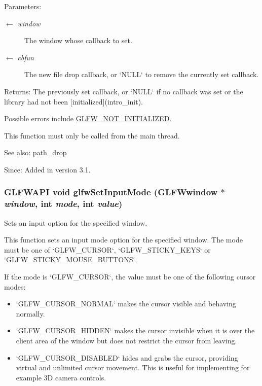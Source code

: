 \begin{Desc}
\item[Parameters:]
\begin{description}
\item[\mbox{$\leftarrow$} {\em window}]The window whose callback to set. \item[\mbox{$\leftarrow$} {\em cbfun}]The new file drop callback, or `NULL` to remove the currently set callback. \end{description}
\end{Desc}
\begin{Desc}
\item[Returns:]The previously set callback, or `NULL` if no callback was set or the library had not been \mbox{[}initialized\mbox{]}(intro\_\-init).\end{Desc}
Possible errors include \hyperlink{group__errors_g2374ee02c177f12e1fa76ff3ed15e14a}{GLFW\_\-NOT\_\-INITIALIZED}.

This function must only be called from the main thread.

\begin{Desc}
\item[See also:]path\_\-drop\end{Desc}
\begin{Desc}
\item[Since:]Added in version 3.1. \end{Desc}
\hypertarget{group__input_ge1eb729d2dd91dc33fd60e150a6e1684}{
\subsubsection[glfwSetInputMode]{\setlength{\rightskip}{0pt plus 5cm}GLFWAPI void glfwSetInputMode ({\bf GLFWwindow} $\ast$ {\em window}, \/  int {\em mode}, \/  int {\em value})}}
\label{group__input_ge1eb729d2dd91dc33fd60e150a6e1684}


Sets an input option for the specified window. 

This function sets an input mode option for the specified window. The mode must be one of `GLFW\_\-CURSOR`, `GLFW\_\-STICKY\_\-KEYS` or `GLFW\_\-STICKY\_\-MOUSE\_\-BUTTONS`.

If the mode is `GLFW\_\-CURSOR`, the value must be one of the following cursor modes:\begin{itemize}
\item `GLFW\_\-CURSOR\_\-NORMAL` makes the cursor visible and behaving normally.\item `GLFW\_\-CURSOR\_\-HIDDEN` makes the cursor invisible when it is over the client area of the window but does not restrict the cursor from leaving.\item `GLFW\_\-CURSOR\_\-DISABLED` hides and grabs the cursor, providing virtual and unlimited cursor movement. This is useful for implementing for example 3D camera controls.\end{itemize}


